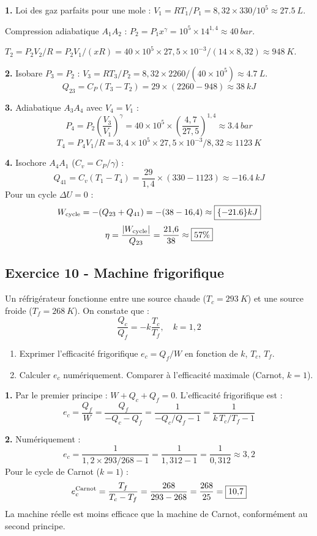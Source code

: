 \documentclass[12pt,a4paper]{article}
\begin{document}
\begin{boitecorrige}
\textbf{1.} Loi des gaz parfaits pour une mole : $V_1 = RT_1/P_1 = 8{,}32\times330/10^5 \approx \qty{27.5}{L}$.

Compression adiabatique $A_1A_2$ : $P_2 = P_1 x^\gamma = 10^5\times14^{1{,}4} \approx \qty{40}{bar}$.

$T_2 = P_2 V_2/R = P_2 V_1/(xR) = 40\times10^5\times27{,}5\times10^{-3}/(14\times8{,}32) \approx \boxed{\qty{948}{K}}$.

\textbf{2.} Isobare $P_3 = P_2$ : $V_3 = RT_3/P_2 = 8{,}32\times2260/(40\times10^5) \approx \qty{4.7}{L}$.
\[
Q_{23} = C_P(T_3-T_2) = 29\times(2260-948) \approx \boxed{\qty{38}{kJ}}
\]

\textbf{3.} Adiabatique $A_3A_4$ avec $V_4=V_1$ :
\[
P_4 = P_2\!\left(\frac{V_3}{V_1}\right)^\gamma = 40\times10^5\times\!\left(\frac{4{,}7}{27{,}5}\right)^{1{,}4} \approx \boxed{\qty{3.4}{bar}}
\]
\[
T_4 = P_4 V_1/R = 3{,}4\times10^5\times27{,}5\times10^{-3}/8{,}32 \approx \boxed{\qty{1123}{K}}
\]

\textbf{4.} Isochore $A_4A_1$ ($C_v = C_P/\gamma$) :
\[
Q_{41} = C_v(T_1-T_4) = \frac{29}{1{,}4}\times(330-1123) \approx \qty{-16.4}{kJ}
\]
Pour un cycle $\Delta U = 0$ :
\[
W_{\rm cycle} = -(Q_{23}+Q_{41}) = -(38-16{,}4) \approx \boxed{\qty{-21.6}{kJ}}
\]
\[
\eta = \frac{|W_{\rm cycle}|}{Q_{23}} = \frac{21{,}6}{38} \approx \boxed{57\%}
\]
\end{boitecorrige}

\subsection*{Exercice 10 - Machine frigorifique \niveau{\moyen}}

\begin{boiteexercice}
Un réfrigérateur fonctionne entre une source chaude ($T_c = \qty{293}{K}$) et une source froide ($T_f = \qty{268}{K}$). On constate que :
\[
\frac{Q_c}{Q_f} = -k\frac{T_c}{T_f}, \quad k = 1{,}2
\]
\begin{enumerate}
  \item Exprimer l'efficacité frigorifique $e_c = Q_f/W$ en fonction de $k$, $T_c$, $T_f$.
  \item Calculer $e_c$ numériquement. Comparer à l'efficacité maximale (Carnot, $k=1$).
\end{enumerate}
\end{boiteexercice}

\begin{boitecorrige}
\textbf{1.} Par le premier principe : $W + Q_c + Q_f = 0$. L'efficacité frigorifique est :
\[
e_c = \frac{Q_f}{W} = \frac{Q_f}{-Q_c-Q_f} = \frac{1}{-Q_c/Q_f - 1} = \frac{1}{k\,T_c/T_f - 1}
\]

\textbf{2.} Numériquement :
\[
e_c = \frac{1}{1{,}2\times293/268 - 1} = \frac{1}{1{,}312 - 1} = \frac{1}{0{,}312} \approx \boxed{3{,}2}
\]
Pour le cycle de Carnot ($k=1$) :
\[
e_c^{\rm Carnot} = \frac{T_f}{T_c-T_f} = \frac{268}{293-268} = \frac{268}{25} = \boxed{10{,}7}
\]
La machine réelle est moins efficace que la machine de Carnot, conformément au second principe.
\end{boitecorrige}
\end{document}
